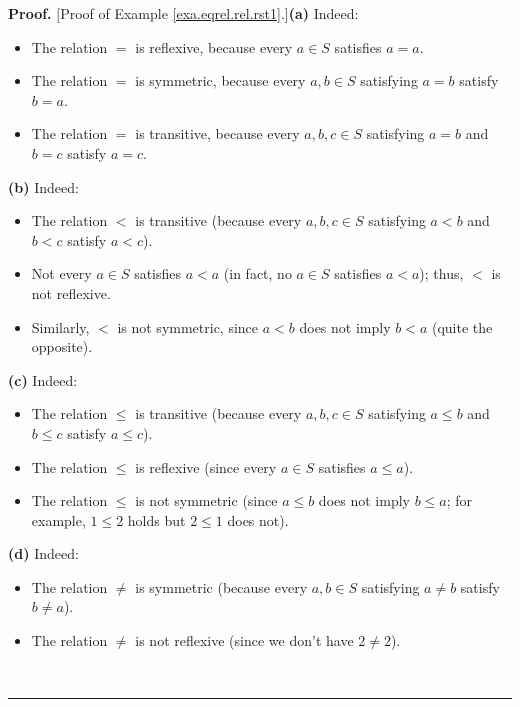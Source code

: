 \documentclass[numbers=enddot,12pt,final,onecolumn,notitlepage]{scrartcl}%
\numberwithin{exer}{subsection}
\theoremstyle{definition}
\newenvironment{proof}[1][Proof]{\noindent\textbf{#1.} }{\ \rule{0.5em}{0.5em}}
\begin{document}
\begin{proof}
[Proof of Example \ref{exa.eqrel.rel.rst1}.]\textbf{(a)} Indeed:

\begin{itemize}
\item The relation $=$ is reflexive, because every $a\in S$ satisfies $a=a$.

\item The relation $=$ is symmetric, because every $a,b\in S$ satisfying $a=b$
satisfy $b=a$.

\item The relation $=$ is transitive, because every $a,b,c\in S$ satisfying
$a=b$ and $b=c$ satisfy $a=c$.
\end{itemize}

\textbf{(b)} Indeed:

\begin{itemize}
\item The relation $<$ is transitive (because every $a,b,c\in S$ satisfying
$a<b$ and $b<c$ satisfy $a<c$).

\item Not every $a\in S$ satisfies $a<a$ (in fact, no $a\in S$ satisfies
$a<a$); thus, $<$ is not reflexive.

\item Similarly, $<$ is not symmetric, since $a<b$ does not imply $b<a$ (quite
the opposite).
\end{itemize}

\textbf{(c)} Indeed:

\begin{itemize}
\item The relation $\leq$ is transitive (because every $a,b,c\in S$ satisfying
$a\leq b$ and $b\leq c$ satisfy $a\leq c$).

\item The relation $\leq$ is reflexive (since every $a\in S$ satisfies $a\leq
a$).

\item The relation $\leq$ is not symmetric (since $a\leq b$ does not imply
$b\leq a$; for example, $1\leq2$ holds but $2\leq1$ does not).
\end{itemize}

\textbf{(d)} Indeed:

\begin{itemize}
\item The relation $\neq$ is symmetric (because every $a,b\in S$ satisfying
$a\neq b$ satisfy $b\neq a$).

\item The relation $\neq$ is not reflexive (since we don't have $2\neq2$).


\end{itemize}
\end{proof}
\end{document}
